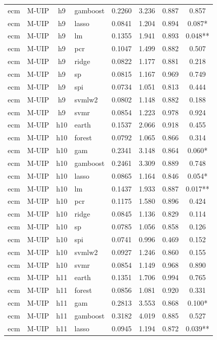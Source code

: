 \begin{ThreePartTable}
\begin{longtable}[t]{llclcccc}
ecm & M-UIP & h9 & gamboost & 0.2260 & 3.236 & 0.887 & 0.857\\
ecm & M-UIP & h9 & lasso & 0.0841 & 1.204 & 0.894 & 0.087*\\
ecm & M-UIP & h9 & lm & 0.1355 & 1.941 & 0.893 & 0.048**\\
ecm & M-UIP & h9 & pcr & 0.1047 & 1.499 & 0.882 & 0.507\\
ecm & M-UIP & h9 & ridge & 0.0822 & 1.177 & 0.881 & 0.218\\
ecm & M-UIP & h9 & sp & 0.0815 & 1.167 & 0.969 & 0.749\\
ecm & M-UIP & h9 & spi & 0.0734 & 1.051 & 0.813 & 0.444\\
ecm & M-UIP & h9 & svmlw2 & 0.0802 & 1.148 & 0.882 & 0.188\\
ecm & M-UIP & h9 & svmr & 0.0854 & 1.223 & 0.978 & 0.924\\
\addlinespace
ecm & M-UIP & h10 & earth & 0.1537 & 2.066 & 0.918 & 0.455\\
ecm & M-UIP & h10 & forest & 0.0792 & 1.065 & 0.866 & 0.314\\
ecm & M-UIP & h10 & gam & 0.2341 & 3.148 & 0.864 & 0.060*\\
ecm & M-UIP & h10 & gamboost & 0.2461 & 3.309 & 0.889 & 0.748\\
ecm & M-UIP & h10 & lasso & 0.0865 & 1.164 & 0.846 & 0.054*\\
ecm & M-UIP & h10 & lm & 0.1437 & 1.933 & 0.887 & 0.017**\\
ecm & M-UIP & h10 & pcr & 0.1175 & 1.580 & 0.896 & 0.424\\
ecm & M-UIP & h10 & ridge & 0.0845 & 1.136 & 0.829 & 0.114\\
ecm & M-UIP & h10 & sp & 0.0785 & 1.056 & 0.858 & 0.126\\
ecm & M-UIP & h10 & spi & 0.0741 & 0.996 & 0.469 & 0.152\\
ecm & M-UIP & h10 & svmlw2 & 0.0927 & 1.246 & 0.860 & 0.155\\
ecm & M-UIP & h10 & svmr & 0.0854 & 1.149 & 0.968 & 0.890\\
\addlinespace
ecm & M-UIP & h11 & earth & 0.1351 & 1.706 & 0.994 & 0.765\\
ecm & M-UIP & h11 & forest & 0.0856 & 1.081 & 0.920 & 0.331\\
ecm & M-UIP & h11 & gam & 0.2813 & 3.553 & 0.868 & 0.100*\\
ecm & M-UIP & h11 & gamboost & 0.3182 & 4.019 & 0.885 & 0.527\\
ecm & M-UIP & h11 & lasso & 0.0945 & 1.194 & 0.872 & 0.039**\\

\end{longtable}
\end{ThreePartTable}
